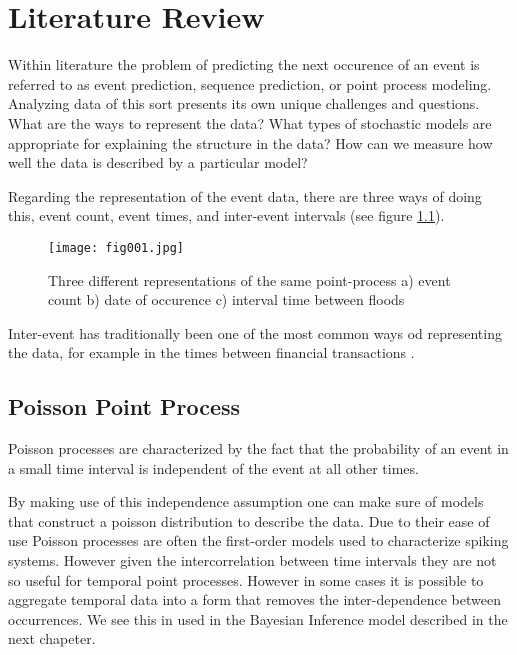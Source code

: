
\chapter{Literature Review} %


\label{Chapter2} %

Within literature the problem of predicting the next occurence of an event is referred to as event prediction, sequence prediction, or point process modeling. Analyzing data of this sort presents its own unique challenges and questions. What are the ways to represent the data?  What types of stochastic 
models  are  appropriate  for  explaining  the  structure  in  the  data? How  can  we  measure  
how  well  the  data  is  described  by  a  particular  model?  

Regarding the representation of the event data, there are three ways of doing this, event count, event times, and inter-event intervals (see figure \ref{fig:fig1}).

\begin{figure}[h!]
	\texttt{[image: fig001.jpg]}
	\caption{Three different representations of the same point-process a) event count b) date of occurence c) interval time between floods}
	\label{fig:fig1}
\end{figure}

Inter-event has traditionally been one of the most common ways od representing the data, for example in the times between financial transactions \parencite{EngleRusell}.

\section{Poisson Point Process}

Poisson processes \parencite{Kingman} are characterized by the fact that the probability of an event in a small time interval is independent of the event at all other times. 

By making use of this independence assumption one can make sure of models that construct a poisson distribution to describe the data. Due to their ease of use Poisson processes are often the first-order models used to  characterize  spiking  systems. However given the intercorrelation between time intervals they are not so useful for temporal point processes. However in some cases it is possible to aggregate temporal data into a form that removes the inter-dependence between occurrences. We see this in used in the Bayesian Inference model described in the next chapeter.

